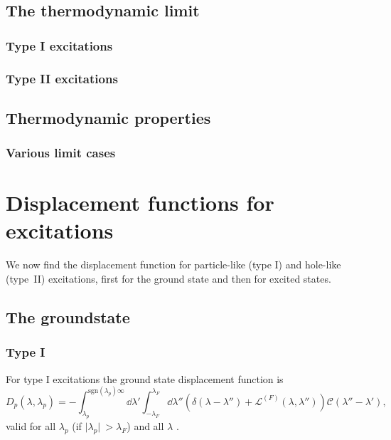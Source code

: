 \documentclass[11pt, a4paper]{report} %
\newcommand{\inversetruncc}{\mathcal{L}}
\newcommand{\kernel}{\mathcal{C}}
\begin{document}
\subsection{The thermodynamic limit}

\subsubsection{Type I excitations}

\subsubsection{Type II excitations}

\subsection{Thermodynamic properties}

\subsubsection{Various limit cases}


\section{Displacement functions for excitations}
We now find the displacement function for particle-like (type I) and hole-like (type~II) excitations, first for the ground state and then for excited states.

\subsection{The groundstate}
\subsubsection{Type I}
For type I excitations the ground state displacement function is 
\begin{equation}\label{eq:particledisplacement}
	D_p(\lambda, \lambda_p) = - \int_{\lambda_p}^{\textrm{sgn}(\lambda_p)\infty} \dd \lambda' \int_{-\lambda_F}^{\lambda_F} \dd  \lambda'' \left(\delta(\lambda-\lambda'') + \inversetruncc^{(F)}(\lambda,\lambda'') \right)\kernel(\lambda''-\lambda'),
\end{equation}
valid for all \(\lambda_p\) (if \(\lvert \lambda_p \rvert\ > \lambda_F\)) and all \(\lambda\) \cite{tofind}.
\end{document}
